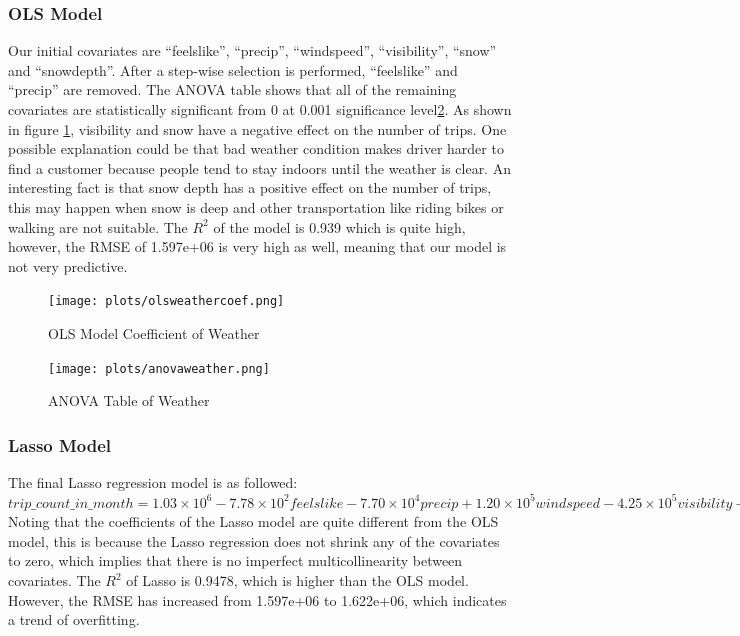 \documentclass[11pt]{article}
\begin{document}
\subsubsection{OLS Model}
Our initial covariates are ``feelslike'', ``precip'', ``windspeed'', ``visibility'', ``snow'' and ``snowdepth''. After a step-wise selection is performed, ``feelslike'' and ``precip'' are removed. The ANOVA table shows that all of the remaining covariates are statistically significant from 0 at 0.001 significance level\ref{fig:weatheranova}. As shown in figure \ref{fig:weathercoef}, visibility and snow have a negative effect on the number of trips. One possible explanation could be that bad weather condition makes driver harder to find a customer because people tend to stay indoors until the weather is clear. An interesting fact is that snow depth has a positive effect on the number of trips, this may happen when snow is deep and other transportation like riding bikes or walking are not suitable. The $R^2$ of the model is 0.939 which is quite high, however, the RMSE of 1.597e+06 is very high as well, meaning that our model is not very predictive.
\begin{figure}[h]
    \texttt{[image: plots/olsweathercoef.png]}
    \centering
    \caption{OLS Model Coefficient of Weather}
    \label{fig:weathercoef}
\end{figure}
\begin{figure}[h]
    \texttt{[image: plots/anovaweather.png]}
    \centering
    \caption{ANOVA Table of Weather}
    \label{fig:weatheranova}
\end{figure}
\subsubsection{Lasso Model}
The final Lasso regression model is as followed: $trip\_count\_in\_month = 1.03\times10^6 - 7.78\times10^2feelslike -7.70\times10^4precip + 1.20\times10^5windspeed - 4.25\times10^5visibility -3.08\times10^6snow + 1.63\times10^6snowdepth.$ Noting that the coefficients of the Lasso model are quite different from the OLS model, this is because the Lasso regression does not shrink any of the covariates to zero, which implies that there is no imperfect multicollinearity between covariates. The $R^2$ of Lasso is 0.9478, which is higher than the OLS model. However, the RMSE has increased from 1.597e+06 to 1.622e+06, which indicates a trend of overfitting.
\end{document}
